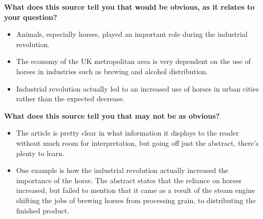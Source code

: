 

\textbf{What does this source tell you that would be obvious, as it relates to your question?}
\begin{itemize}
    \item Animals, especially horses, played an important role during the industrial revolution.
    \item The economy of the UK metropolitan area is very dependent on the use of horses in industries such as brewing and alcohol distribution.
    \item Industrial revolution actually led to an increased use of horses in urban cities rather than the expected decrease.
    \\
\end{itemize}

\textbf{What does this source tell you that may not be as obvious?}
\begin{itemize}
    \item The article is pretty clear in what information it displays to the reader without much room for interpretation, but going off just the abstract, there's plenty to learn.
    \item One example is how the industrial revolution actually increased the importance of the horse.  The abstract states that the reliance on horses increased, but failed to mention that it came as a result of the steam engine shifting the jobs of brewing  horses from processing grain, to distributing the finished product.
\end{itemize}